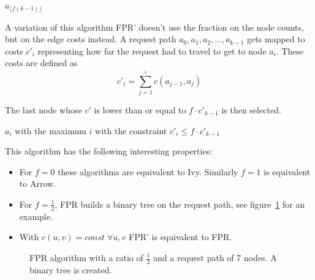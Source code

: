 \documentclass[a4paper, oneside]{discothesis}
\begin{document}
\begin{algorithmic}
\State\Return $a_{\lfloor f(k-1)\rfloor}$
\EndFunction
\end{algorithmic}

A variation of this algorithm FPR' doesn't use the fraction on the node counts, but on the edge costs instead. A request path $a_0,a_1,a_2,\dots,a_{k-1}$ gets mapped to costs $c'_i$ representing how far the request had to travel to get to node $a_i$. These costs are defined as
\begin{equation}
c'_i=\sum_{j=1}^ic(a_{j-1},a_j)
\end{equation}

The last node whose $c'$ is lower than or equal to $f\cdot c'_{k-1}$ is then selected.

\begin{algorithmic}
\State\Return $a_i$ with the maximum $i$ with the constraint $c'_i\leq f\cdot c'_{k-1}$ 
\EndFunction
\end{algorithmic}

This algorithm has the following interesting properties:
\begin{itemize}
\item For $f=0$ these algorithms are equivalent to Ivy. Similarly $f=1$ is equivalent to Arrow.
\item For $f=\frac{1}{2}$, FPR builds a binary tree on the request path, see figure~\ref{fig:fpr} for an example.
\item With $c(u,v)=const\;\forall u,v$ FPR' is equivalent to FPR.

\end{itemize}

\begin{figure}
\centering
{}
\caption{FPR algorithm with a ratio of $\frac{1}{2}$ and a request path of 7 nodes. A binary tree is created.}
\label{fig:fpr}
\end{figure}
\end{document}
